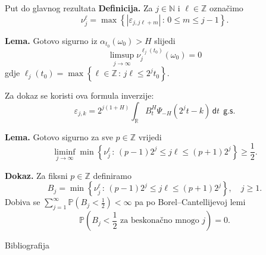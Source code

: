 \documentclass{beamer}
\renewcommand{\mathrm}[1]{\mathsf{#1}}
\newcommand{\ub}{\rightarrow \infty}
\newcommand{\st}{\, \colon \,}
\newcommand{\D}{\,\mathrm d}
\newcommand{\R}{\mathbb{R}}
\newcommand{\N}{\mathbb{N}}
\newcommand{\Z}{\mathbb{Z}}
\renewcommand{\P}{\mathbb{P}}
\newcommand{\mathgs}{\ \ \mathrm{g.s.}}
\newcommand{\abs}[1]{\left| {#1} \right|}
\begin{document}
\begin{frame}[allowframebreaks]{Put do glavnog rezultata}
	\textbf{Definicija.} Za \( j \in \N \) i \( \ell \in \Z \) označimo
	\begin{equation}
		\nu_j^\ell = \max \left\{ \abs{\varepsilon_{j,j\ell+m}} \st 0 \le m \le j-1 \right\}.
	\end{equation}

	\vskip10pt
	\textbf{Lema.} Gotovo sigurno iz \( \alpha_{t_0}(\omega_0) > H \) slijedi
	\begin{equation}
		\limsup\limits_{j \ub} \nu_j^{\ell_j(t_0)}(\omega_0) = 0
	\end{equation}
	gdje \( \ell_j(t_0) = \max\left\{ \ell \in \Z \st j\ell \le 2^jt_0 \right\} \).

	\vskip10pt
	Za dokaz se koristi ova formula inverzije:
	\begin{equation}
		\varepsilon_{j,k} = 2^{j(1+H)}\int_\R B^H_t\Psi_{-H}(2^jt-k) \D t \mathgs
	\end{equation}

	\framebreak
	\textbf{Lema.} Gotovo sigurno za sve \( p \in \Z \) vrijedi
	\begin{equation}
		\liminf\limits_{j \ub} \min \left\{ \nu_j^\ell \st
		(p-1)2^j \le j\ell \le (p+1)2^j \right\} \ge \frac 12.
	\end{equation}

	\vskip10pt

	\textbf{Dokaz.} Za fiksni \( p \in \Z \) definiramo
	\[ B_j = \min \left\{ \nu_j^\ell \st (p-1)2^j \le j\ell \le (p+1)2^j \right\},
		\quad j \ge 1.
	\]
	Dobiva se \( \sum\limits_{j=1}^\infty \P\left(B_j < \frac 12\right) < \infty \)
	pa po Borel--Cantellijevoj lemi
	\[
		\P \left( B_j < \frac 12 \text{ za beskonačno mnogo } j \right) = 0.
	\]
\end{frame}

\begin{frame}[t, allowframebreaks]{Bibliografija}
	\printbibliography
\end{frame}
\end{document}
